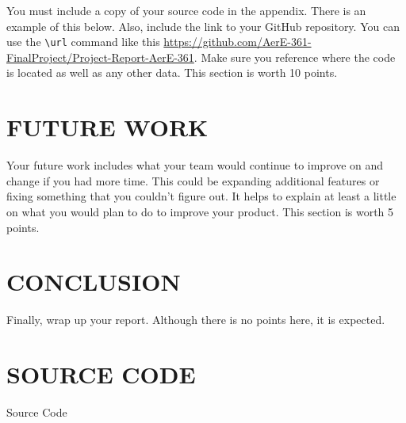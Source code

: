 \documentclass[12pt]{article}
\begin{document}
You must include a copy of your source code in the appendix.  There is an example of this below.  Also, include the link to your GitHub repository.  You can use the \verb=\url=  command like this \url{https://github.com/AerE-361-FinalProject/Project-Report-AerE-361}. Make sure you reference where the code is located as well as any other data. This section is worth 10 points. 


\section{FUTURE WORK}
Your future work includes what your team would continue to improve on and change if you had more time.  This could be expanding additional features or fixing something that you couldn't figure out.  It helps to explain at least a little on what you would plan to do to improve your product. This section is worth 5 points.

\section{CONCLUSION}
Finally, wrap up your report. Although there is no points here, it is expected.

\newpage



\newpage
\appendix

\section{SOURCE CODE}
Source Code

\end{document}
